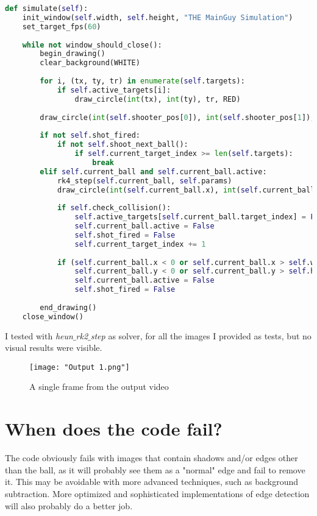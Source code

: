 \documentclass{article}
\begin{document}
\newpage
\begin{lstlisting}[language=python]
def simulate(self):
	init_window(self.width, self.height, "THE MainGuy Simulation")
	set_target_fps(60)
	
	while not window_should_close():
		begin_drawing()
		clear_background(WHITE)
		
		for i, (tx, ty, tr) in enumerate(self.targets):
			if self.active_targets[i]:
				draw_circle(int(tx), int(ty), tr, RED)
		
		draw_circle(int(self.shooter_pos[0]), int(self.shooter_pos[1]), self.shooter_radius, GREEN)
		
		if not self.shot_fired:
			if not self.shoot_next_ball():
				if self.current_target_index >= len(self.targets):
					break
		elif self.current_ball and self.current_ball.active:
			rk4_step(self.current_ball, self.params)
			draw_circle(int(self.current_ball.x), int(self.current_ball.y), self.current_ball.radius, BLUE)
			
			if self.check_collision():
				self.active_targets[self.current_ball.target_index] = False
				self.current_ball.active = False
				self.shot_fired = False
				self.current_target_index += 1
				
			if (self.current_ball.x < 0 or self.current_ball.x > self.width or
				self.current_ball.y < 0 or self.current_ball.y > self.height):
				self.current_ball.active = False
				self.shot_fired = False
			
		end_drawing()
	close_window()
\end{lstlisting}

	I tested with \textit{heun$\_$rk2$\_$step} as solver, for all the images I provided as tests, but no visual results were visible.
\begin{figure}[H]
	\centering
	\texttt{[image: "Output 1.png"]}
	\caption{A single frame from the output video}
\end{figure}
	
	\section*{When does the code fail?}
	
	The code obviously fails with images that contain shadows and/or edges other than the ball, as it will probably see them as a "normal" edge and fail to remove it. This may be avoidable with more advanced techniques, such as background subtraction. More optimized and sophisticated implementations of edge detection will also probably do a better job.
	
\end{document}
